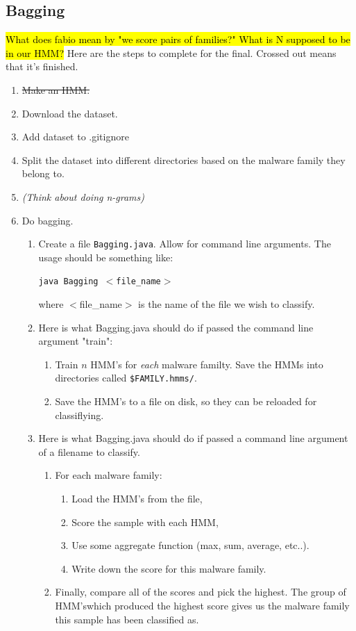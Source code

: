 \documentclass[12pt]{article}
\begin{document}
\subsection{Bagging}
\hl{What does fabio mean by "we score pairs of families?" What is N supposed to be in our HMM?}
Here are the steps to complete for the final. Crossed out means that it's finished.
\begin{enumerate}
  \item \st{Make an HMM.}
  \item Download the dataset.
  \item Add dataset to .gitignore
  \item Split the dataset into different directories based on the malware family they belong to.
  \item \textit{(Think about doing n-grams)}
  \item Do bagging.
    \begin{enumerate}
  \item Create a file \texttt{Bagging.java}. Allow for command line arguments. The usage should be something like: 
        
    \texttt{java Bagging $<$file\_name$>$}

    where $<$file\_name$>$ is the name of the file we wish to classify.

  \item Here is what Bagging.java should do if passed the command line argument "train":
    \begin{enumerate}
      \item Train $n$ HMM's for \textit{each} malware familty. Save the HMMs into directories called \texttt{\$FAMILY.hmms/}.
      \item Save the HMM's to a file on disk, so they can be reloaded for classiflying.
    \end{enumerate}

  \item Here is what Bagging.java should do if passed a command line argument of a filename to classify.
    \begin{enumerate}
      \item For each malware family:
        \begin{enumerate}
      \item Load the HMM's from the file,
      \item Score the sample with each HMM,
      \item Use some aggregate function (max, sum, average, etc..).
      \item Write down the score for this malware family.
        \end{enumerate}
      \item Finally, compare all of the scores and pick the highest. The group of HMM'swhich produced the highest score gives us the malware family this sample has been classified as.
    \end{enumerate}
    \end{enumerate}
\end{enumerate}
\end{document}
